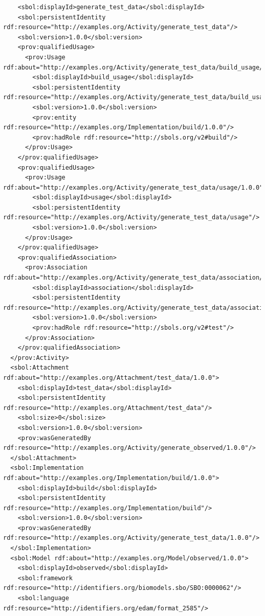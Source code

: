 \begin{lstlisting}
    <sbol:displayId>generate_test_data</sbol:displayId>
    <sbol:persistentIdentity rdf:resource="http://examples.org/Activity/generate_test_data"/>
    <sbol:version>1.0.0</sbol:version>
    <prov:qualifiedUsage>
      <prov:Usage rdf:about="http://examples.org/Activity/generate_test_data/build_usage/1.0.0">
        <sbol:displayId>build_usage</sbol:displayId>
        <sbol:persistentIdentity rdf:resource="http://examples.org/Activity/generate_test_data/build_usage"/>
        <sbol:version>1.0.0</sbol:version>
        <prov:entity rdf:resource="http://examples.org/Implementation/build/1.0.0"/>
        <prov:hadRole rdf:resource="http://sbols.org/v2#build"/>
      </prov:Usage>
    </prov:qualifiedUsage>
    <prov:qualifiedUsage>
      <prov:Usage rdf:about="http://examples.org/Activity/generate_test_data/usage/1.0.0">
        <sbol:displayId>usage</sbol:displayId>
        <sbol:persistentIdentity rdf:resource="http://examples.org/Activity/generate_test_data/usage"/>
        <sbol:version>1.0.0</sbol:version>
      </prov:Usage>
    </prov:qualifiedUsage>
    <prov:qualifiedAssociation>
      <prov:Association rdf:about="http://examples.org/Activity/generate_test_data/association/1.0.0">
        <sbol:displayId>association</sbol:displayId>
        <sbol:persistentIdentity rdf:resource="http://examples.org/Activity/generate_test_data/association"/>
        <sbol:version>1.0.0</sbol:version>
        <prov:hadRole rdf:resource="http://sbols.org/v2#test"/>
      </prov:Association>
    </prov:qualifiedAssociation>
  </prov:Activity>
  <sbol:Attachment rdf:about="http://examples.org/Attachment/test_data/1.0.0">
    <sbol:displayId>test_data</sbol:displayId>
    <sbol:persistentIdentity rdf:resource="http://examples.org/Attachment/test_data"/>
    <sbol:size>0</sbol:size>
    <sbol:version>1.0.0</sbol:version>
    <prov:wasGeneratedBy rdf:resource="http://examples.org/Activity/generate_observed/1.0.0"/>
  </sbol:Attachment>
  <sbol:Implementation rdf:about="http://examples.org/Implementation/build/1.0.0">
    <sbol:displayId>build</sbol:displayId>
    <sbol:persistentIdentity rdf:resource="http://examples.org/Implementation/build"/>
    <sbol:version>1.0.0</sbol:version>
    <prov:wasGeneratedBy rdf:resource="http://examples.org/Activity/generate_test_data/1.0.0"/>
  </sbol:Implementation>
  <sbol:Model rdf:about="http://examples.org/Model/observed/1.0.0">
    <sbol:displayId>observed</sbol:displayId>
    <sbol:framework rdf:resource="http://identifiers.org/biomodels.sbo/SBO:0000062"/>
    <sbol:language rdf:resource="http://identifiers.org/edam/format_2585"/>

\end{lstlisting}
